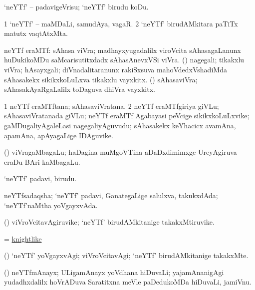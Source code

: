 \bentry
{}
\gl{\sakirx}
\bmng
`neYTf' -- padavigeVrisu; `neYTf' birudu koDu. 
\emng
\eentry

\bentry
{}
\gl{\nA}
\bmng
\bnum
\num{1} `neYTf' -- maMDaLi, samudAya, vagaR. 
\num{2} `neYTf' birudAMkitara paTiTx matutx vaqtAtxMta. 
\enum
\emng
\eentry

\bentry
{}
\gl{\nA}
\bmng
neYTf eraMTf: 
\banum
{} sAhasa viVra; madhayxyugadalilx viroVcita sAhasagaLanunx huDukikoMDu saMcarisutitxdadx sAhasAnevxVSi viVra. 
 (\rUpa) nagegali; tikakxlu viVra; hAsayxgali; diVnadalitaranunx rakiSxsuva mahoVdedxVshadiMda sAhasakekx sikikxkoLuLxva tikakxlu vayxkitx. 
 (\rUpa) sAhasaviVra; sAhasakAyaRgaLalilx toDaguva dhiVra vayxkitx. 
\eanum
\emng
\eentry

\bentry
{}
\gl{\nA}
\bmng
\bnum
\num{1} neYTf eraMTftana; sAhasaviVratana. 
\num{2} neYTf eraMTfgiriya giVLu; sAhasaviVratanada giVLu; neYTf eraMTf Agabayasi peVcige sikikxkoLuLxvike; gaMDugaliyAgaleLasi nagegaliyAguvudu; sAhasakekx keYhacicx avamAna, apamAna, apAyagaLige IDAguvike. 
\enum
\emng
\eentry

\bentry
{}
\gl{\nA}
\bmng
(\bava) viVragaMbagaLu; haDagina muMgoVTina aDaDxdimimxge UreyAgiruva eraDu BAri kaMbagaLu. 
\emng
\eentry

\bentry
{}
\gl{\nA}
\bmng
`neYTf' padavi, birudu. 
\emng
\eentry

\bentry
{}
\gl{\gu}
\bmng
neYTfsadaqsha; `neYTf' padavi, GanategaLige salulxva, takukxdAda; `neYTf'naMtha yoVgayxvAda. 
\emng
\eentry

\bentry
{}
\gl{\nA}
\bmng
(\kAparx) 
\emng
viVroVcitavAgiruvike; `neYTf' birudAMkitanige takakxMtiruvike. \eentry

\bentry
{}
\gl{\gu}
\bmng
= \hyperlink{knightlike}{knightlike} 
\emng
\eentry

\bentry
{}
\gl{\kirxvi}
\bmng
(\kAparx) `neYTf' yoVgayxvAgi; viVroVcitavAgi; `neYTf' birudAMkitanige takakxMte. 
\emng
\eentry

\bentry
{}
\gl{\nA}
\bmng
(\ca) neYTfmAnayx; ULigamAnayx yoVdhana hiDuvaLi; yajamAnanigAgi yudadhxdalilx hoVrADuva Saratitxna meVle paDedukoMDa hiDuvaLi, jamiVnu. 
\emng
\eentry

